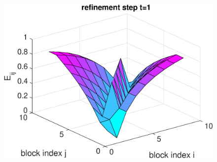 \begin{example}
{%
%
\vspace*{1em}
\begin{figure}[h!]
\hspace{-1cm}
\centering
\hspace*{2em}
\begin{minipage}[t]{0.48\linewidth}
\centering
\includegraphics[width=0.99\linewidth]{figures/9times9_Z3_Error_t1.eps}
\end{minipage}
%
\begin{minipage}[t]{0.48\linewidth}

\end{minipage}
\end{figure}}
\end{example}
